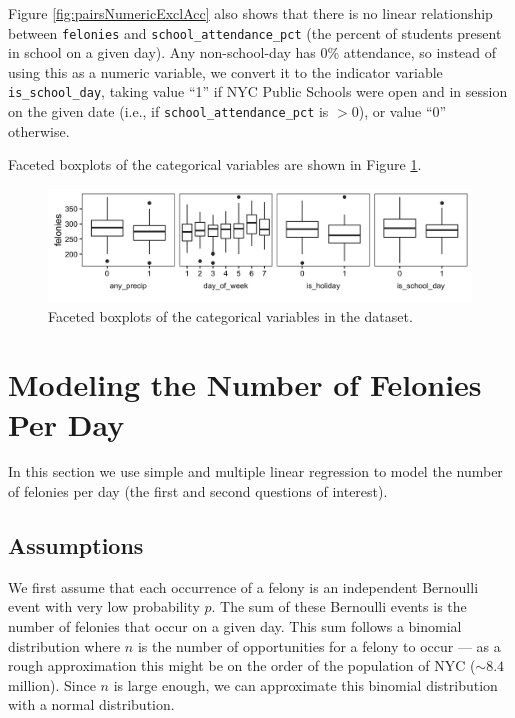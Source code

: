 \documentclass[11pt,notitlepage]{article}
\begin{document}
Figure \ref{fig:pairsNumericExclAcc} also shows that there is no linear relationship between \texttt{felonies} and \texttt{school_attendance_pct} (the percent of students present in school on a given day). Any non-school-day has 0\% attendance, so instead of using this as a numeric variable, we convert it to the indicator variable \texttt{is_school_day}, taking value ``1'' if NYC Public Schools were open and in session on the given date (i.e., if \texttt{school_attendance_pct} is $>0$), or value ``0'' otherwise.

Faceted boxplots of the categorical variables are shown in Figure \ref{fig:facetCategorical}.

\begin{figure}[!h]
	\centering
	\captionsetup{width=0.9\textwidth}
	\includegraphics[width=6in]{figures/facetCategorical.png}
	\caption{Faceted boxplots of the categorical variables in the dataset.}
	\label{fig:facetCategorical}
\end{figure}

\section{Modeling the Number of Felonies Per Day}

In this section we use simple and multiple linear regression to model the number of felonies per day (the first and second questions of interest).

\subsection{Assumptions}
\label{sec:feloniesAssumptions}

We first assume that each occurrence of a felony is an independent Bernoulli event with very low probability $p$. The sum of these Bernoulli events is the number of felonies that occur on a given day. This sum follows a binomial distribution where $n$ is the number of opportunities for a felony to occur --- as a rough approximation this might be on the order of the population of NYC ($\sim 8.4$ million). Since $n$ is large enough, we can approximate this binomial distribution with a normal distribution.
\end{document}
